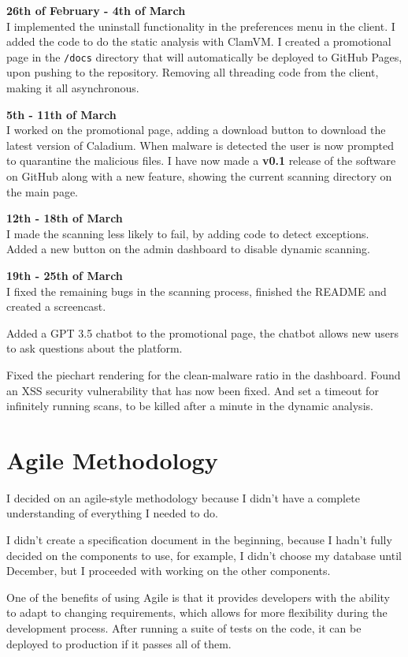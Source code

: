 \textbf{26th of February - 4th of March} \\
I implemented the uninstall functionality in the preferences menu in the client.
I added the code to do the static analysis with ClamVM.
I created a promotional page in the \texttt{/docs} directory
that will automatically be deployed to GitHub Pages,
upon pushing to the repository.
Removing all threading code from the client, making it all asynchronous.

\textbf{5th - 11th of March} \\
I worked on the promotional page, adding a download button to
download the latest version of Caladium.
When malware is detected the user is now
prompted to quarantine the malicious files.
I have now made a \textbf{v0.1} release of the software on GitHub
along with a new feature, showing the current scanning directory on the main page.

\textbf{12th - 18th of March} \\
I made the scanning less likely to fail, by adding code to detect exceptions.
Added a new button on the admin dashboard to disable dynamic scanning.

\textbf{19th - 25th of March} \\
I fixed the remaining bugs in the scanning process,
finished the README and created a screencast.

Added a GPT 3.5 chatbot to the promotional page,
the chatbot allows new users to ask questions about the platform.

Fixed the piechart rendering for the clean-malware ratio in the dashboard.
Found an XSS security vulnerability that has now been fixed.
And set a timeout for infinitely running scans,
to be killed after a minute in the dynamic analysis.

\section{Agile Methodology}
I decided on an agile-style methodology because
I didn't have a complete understanding of everything I needed to do.

I didn't create a specification document in the beginning,
because I hadn't fully decided on the components to use,
for example, I didn't choose my database until December,
but I proceeded with working on the other components.

One of the benefits of using Agile is that it provides developers
with the ability to adapt to changing requirements,
which allows for more flexibility during the development process.
After running a suite of tests on the code,
it can be deployed to production if it passes all of them.

